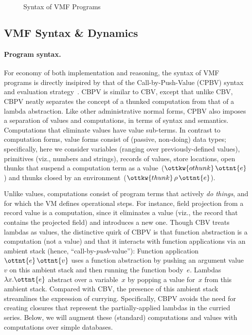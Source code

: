 \begin{figure}
\begin{grammar}
\end{grammar}
\caption{Syntax of VMF Programs}
\label{fig-syntax}
\end{figure}

\subsection{VMF Syntax \& Dynamics}

\paragraph{Program syntax.}
For economy of both implementation and reasoning, the syntax of VMF
programs is directly insipired by that of the Call-by-Push-Value
(CPBV) syntax and evaluation strategy~\cite{CBPV}.
%
CBPV is similar to CBV, except that unlike CBV, CBPV neatly separates
the concept of a thunked computation from that of a lambda
abstraction.
%
Like other administrative normal forms, CPBV also imposes a separation
of values and computations, in terms of syntax and semantics.
%
Computations that eliminate values have value sub-terms.
%
In contrast to computation forms, value forms consist of (passive,
non-doing) data types; specifically, here we consider variables
(ranging over previously-defined values), primitives (viz., numbers
and strings), records of values, store locations, open thunks that
suspend a computation term as a value~($\ottkw{othunk} \, \ottnt{e}$) and thunks
closed by an environment~($\ottkw{thunk} \, \rho \, \ottnt{e}$).

Unlike values, computations consist of program terms that actively
\emph{do things}, and for which the VM defines operational steps. For
instance, field projection from a record value is a computation, since
it eliminates a value (viz., the record that contains the projected
field) and introduces a new one.
%
Though CBV treats lambdas as values, the distinctive quirk of CBPV is
that function abstraction is a computation (not a value) and that it
interacts with function applications via an ambient stack (hence,
``call-by-\emph{push}-value''):
%
Function application~$\ottnt{e} \, \ottnt{v}$ uses a function abstraction by pushing
an argument value~$v$ on this ambient stack and then running the
function body~$e$.
%
Lambdas~$ \lambda  x .  \ottnt{e} $ abstract over a variable~$x$ by popping a value
for~$x$ from this ambient stack.
%
Compared with CBV, the presence of this ambient stack streamlines the
expression of currying.
%
Specifically, CBPV avoids the need for creating closures that
represent the partially-applied lambdas in the curried series.
%
Below, we will augment these (standard) computations and values with
computations over simple databases.

